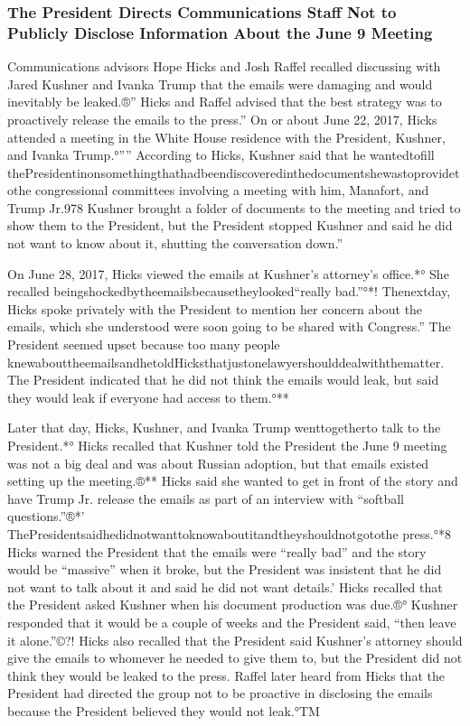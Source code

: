 \subsubsection{The President Directs Communications Staff Not to Publicly Disclose Information About the June 9 Meeting}

Communications advisors Hope Hicks and Josh Raffel recalled discussing with Jared Kushner and Ivanka Trump that the emails were damaging and would inevitably be leaked.®”
Hicks and Raffel advised that the best strategy was to proactively release the emails to the press.”
On or about June 22, 2017, Hicks attended a meeting in the White House residence with the President, Kushner, and Ivanka Trump.°””
According to Hicks, Kushner said that he wantedtofill thePresidentinonsomethingthathadbeendiscoveredinthedocumentshewastoprovidetothe congressional committees involving a meeting with him, Manafort, and Trump Jr.978
Kushner brought a folder of documents to the meeting and tried to show them to the President, but the President stopped Kushner and said he did not want to know about it, shutting the conversation down.”

On June 28, 2017, Hicks viewed the emails at Kushner's attorney's office.*°
She recalled beingshockedbytheemailsbecausetheylooked“really bad.”°*!
Thenextday, Hicks spoke privately with the President to mention her concern about the emails, which she understood were soon going to be shared with Congress.”
The President seemed upset because too many people knewabouttheemailsandhetoldHicksthatjustonelawyershoulddealwiththematter.
The President indicated that he did not think the emails would leak, but said they would leak if everyone had access to them.°**

Later that day, Hicks, Kushner, and Ivanka Trump wenttogetherto talk to the President.*°
Hicks recalled that Kushner told the President the June 9 meeting was not a big deal and was about Russian adoption, but that emails existed setting up the meeting.®**
Hicks said she wanted to get in front of the story and have Trump Jr. release the emails as part of an interview with “softball questions.”®*'
ThePresidentsaidhedidnotwanttoknowaboutitandtheyshouldnotgotothe press.°*8 Hicks warned the President that the emails were “really bad” and the story would be “massive” when it broke, but the President was insistent that he did not want to talk about it and said he did not want details.'
Hicks recalled that the President asked Kushner when his document production was due.®° Kushner responded that it would be a couple of weeks and the President said, “then leave it alone.”©?!
Hicks also recalled that the President said Kushner's attorney should give the emails to whomever he needed to give them to, but the President did not think they would be leaked to the press.
Raffel later heard from Hicks that the President had directed the group not to be proactive in disclosing the emails because the President believed they would not leak.°TM

